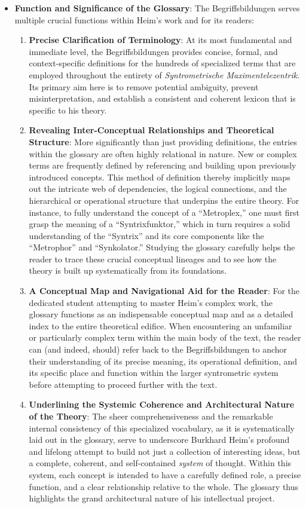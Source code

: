 \documentclass[
    12pt,              %
    a4paper,           %
    headings=normal,   %
    twoside=true,      %
    BCOR=8mm,          %
]{scrbook}
\newcommand{\q}[1]{\enquote{#1}}
\begin{document}
\begin{itemize}
    \item \textbf{Function and Significance of the Glossary}:
    The Begriffsbildungen serves multiple crucial functions within Heim's work and for its readers:
    \begin{enumerate}
        \item \textbf{Precise Clarification of Terminology}: At its most fundamental and immediate level, the Begriffsbildungen provides concise, formal, and context-specific definitions for the hundreds of specialized terms that are employed throughout the entirety of \textit{Syntrometrische Maximentelezentrik}. Its primary aim here is to remove potential ambiguity, prevent misinterpretation, and establish a consistent and coherent lexicon that is specific to his theory.
        \item \textbf{Revealing Inter-Conceptual Relationships and Theoretical Structure}: More significantly than just providing definitions, the entries within the glossary are often highly relational in nature. New or complex terms are frequently defined by referencing and building upon previously introduced concepts. This method of definition thereby implicitly maps out the intricate web of dependencies, the logical connections, and the hierarchical or operational structure that underpins the entire theory. For instance, to fully understand the concept of a \q{Metroplex,} one must first grasp the meaning of a \q{Syntrixfunktor,} which in turn requires a solid understanding of the \q{Syntrix} and its core components like the \q{Metrophor} and \q{Synkolator.} Studying the glossary carefully helps the reader to trace these crucial conceptual lineages and to see how the theory is built up systematically from its foundations.
        \item \textbf{A Conceptual Map and Navigational Aid for the Reader}: For the dedicated student attempting to master Heim's complex work, the glossary functions as an indispensable conceptual map and as a detailed index to the entire theoretical edifice. When encountering an unfamiliar or particularly complex term within the main body of the text, the reader can (and indeed, should) refer back to the Begriffsbildungen to anchor their understanding of its precise meaning, its operational definition, and its specific place and function within the larger syntrometric system before attempting to proceed further with the text.
        \item \textbf{Underlining the Systemic Coherence and Architectural Nature of the Theory}: The sheer comprehensiveness and the remarkable internal consistency of this specialized vocabulary, as it is systematically laid out in the glossary, serve to underscore Burkhard Heim's profound and lifelong attempt to build not just a collection of interesting ideas, but a complete, coherent, and self-contained \textit{system} of thought. Within this system, each concept is intended to have a carefully defined role, a precise function, and a clear relationship relative to the whole. The glossary thus highlights the grand architectural nature of his intellectual project.
    \end{enumerate}


\end{itemize}
\end{document}
